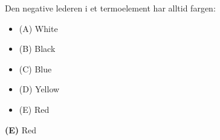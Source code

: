 

Den negative lederen i et termoelement har alltid fargen:

\begin{itemize}
\item{(A)} White
\vskip 5pt 
\item{(B)} Black
\vskip 5pt 
\item{(C)} Blue
\vskip 5pt 
\item{(D)} Yellow
\vskip 5pt 
\item{(E)} Red
\end{itemize}







{\bf (E)} Red
 









